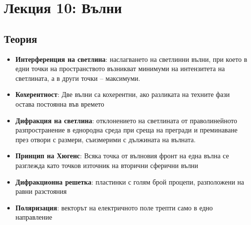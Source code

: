 \documentclass[fleqn, 12pt]{article}
\theoremstyle{definition}
\begin{document}
\newpage
\section{Лекция 10: Вълни}

\subsection{Теория}
\begin{itemize}
\item \textbf{Интерференция на светлина}: наслагването на светлинни вълни, при
което в едни точки на пространството възникват минимуми на интензитета на
светлината, а в други точки – максимуми.
\item \textbf{Кохерентност}: Две вълни са кохерентни, ако разликата на техните фази остава
постоянна във времето
\item \textbf{Дифракция на светлина}: отклонението
на светлината от праволинейното разпространение в
еднородна среда при среща на прегради и преминаване
през отвори с размери, съизмерими с дължината на
вълната.
\item \textbf{Принцип на Хюгенс}: Всяка точка от вълновия фронт на една вълна се разглежда като точков
източник на вторични сферични вълни
\item \textbf{Дифракционна решетка}: пластинки с голям брой процепи, разположени на равни разстояния
\item \textbf{Поляризация}: векторът на електричното поле трепти само в едно направление
\end{itemize}

\newpage
\end{document}
